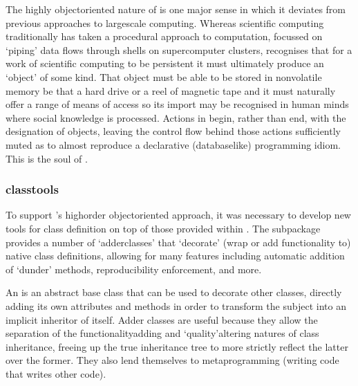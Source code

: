 \documentclass[letterpaper,10pt,english]{jupyterBook}
\begin{document}
\sphinxAtStartPar
The highly object\sphinxhyphen{}oriented nature of  is one major sense in which it deviates from previous approaches to large\sphinxhyphen{}scale computing. Whereas scientific computing traditionally has taken a procedural approach to computation, focussed on ‘piping’ data flows through shells on supercomputer clusters,  recognises that \sphinxhyphen{} for a work of scientific computing to be persistent \sphinxhyphen{} it must ultimately produce an ‘object’ of some kind. That object must be able to be stored in non\sphinxhyphen{}volatile memory \sphinxhyphen{} be that a hard drive or a reel of magnetic tape \sphinxhyphen{} and it must naturally offer a range of means of access so its import may be recognised in human minds where social knowledge is processed. Actions in  begin, rather than end, with the designation of objects, leaving the control flow behind those actions sufficiently muted as to almost reproduce a declarative (database\sphinxhyphen{}like) programming idiom. This is the soul of .


\subsubsection{ classtools}
\label{\detokenize{content/chapter_03_everest/implementation:everest-classtools}}
\sphinxAtStartPar
To support ’s high\sphinxhyphen{}order object\sphinxhyphen{}oriented approach, it was necessary to develop new tools for class definition on top of those provided within . The  subpackage provides a number of ‘adderclasses’ that ‘decorate’ (wrap or add functionality to) native  class definitions, allowing for many features including automatic addition of ‘dunder’ methods, reproducibility enforcement, and more.

\sphinxAtStartPar
An  is an abstract base class that can be used to decorate other classes, directly adding its own attributes and methods in order to transform the subject into an implicit inheritor of itself. Adder classes are useful because they allow the separation of the functionality\sphinxhyphen{}adding and ‘quality’\sphinxhyphen{}altering natures of class inheritance, freeing up the true inheritance tree to more strictly reflect the latter over the former. They also lend themselves to metaprogramming (writing code that writes other code).
\end{document}

